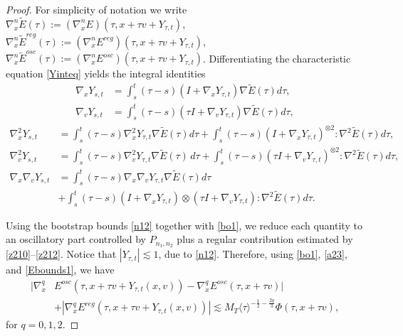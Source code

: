 \documentclass[reqno,11pt]{amsart}
\numberwithin{equation}{section}
\begin{document}
\begin{proof}
	For simplicity of notation we write $\nabla_x^n\widetilde{E}(\tau):=(\nabla_x^nE)(\tau,x+\tau v+Y_{\tau,t})$, $\nabla_x^n\widetilde{E}^{reg}(\tau):=(\nabla_x^nE^{reg})(\tau,x+\tau v+Y_{\tau,t})$, $\nabla_x^n\widetilde{E}^{osc}(\tau):=(\nabla_x^nE^{osc})(\tau,x+\tau v+Y_{\tau,t})$. Differentiating the characteristic equation \eqref{Yinteq} yields the integral identities
	\begin{equation}\label{nabla1Y}
		\begin{split}
			\nabla_xY_{s,t}&=\int_s^t(\tau-s)(I+\nabla_{x}Y_{\tau,t})\nabla \widetilde{E}(\tau)d\tau,\\
			\nabla_vY_{s,t}&=\int_s^t(\tau-s)(\tau I+\nabla_{v}Y_{\tau,t})\nabla \widetilde{E}(\tau)d\tau,
		\end{split}
	\end{equation}
	\begin{equation}\label{nabla2Y}
		\begin{split}
			\nabla_x^2Y_{s,t}&=\int_s^t(\tau-s)\nabla_{x}^2Y_{\tau,t}\nabla \widetilde{E}(\tau)d\tau+\int_s^t(\tau-s)(I+\nabla_{x}Y_{\tau,t})^{\otimes 2}:\nabla^2 \widetilde{E}(\tau)d\tau,\\
			\nabla_v^2Y_{s,t}&=\int_s^t(\tau-s)\nabla_{v}^2Y_{\tau,t}\nabla \widetilde{E}(\tau)\,d\tau+\int_s^t(\tau-s)(\tau I+\nabla_{v}Y_{\tau,t})^{\otimes 2}:\nabla^2 \widetilde{E}(\tau)d\tau,\\
			\nabla_x\nabla_{v}Y_{s,t}&=\int_s^t(\tau-s)\nabla_{x}\nabla_vY_{\tau,t}\nabla \widetilde{E}(\tau)d\tau\\
			&+\int_s^t(\tau-s)(I+\nabla_{x}Y_{\tau,t})\otimes (\tau I+\nabla_{v}Y_{\tau,t}):\nabla^2 \widetilde{E}(\tau)d\tau.
		\end{split}
	\end{equation}
	
	Using the bootstrap bounds \eqref{n12} together with \eqref{bo1}, we reduce each quantity to an oscillatory part controlled by $P_{n_1,n_2}$ plus a regular contribution estimated by \eqref{z210}--\eqref{z212}. Notice that $|Y_{\tau,t}|\lesssim1$, due to \eqref{n12}. Therefore, using \eqref{bo1}, \eqref{a23}, and \eqref{Ebounds1}, we have
	\begin{equation}\label{Ecomp}
		\begin{split}
			|\nabla_x^q&E^{osc}(\tau,x+\tau v+Y_{\tau,t}(x,v))
			-\nabla_x^qE^{osc}(\tau,x+\tau v)|\\
			&+|\nabla_x^qE^{reg}(\tau,x+\tau v+Y_{\tau,t}(x,v))|\lesssim M_T\langle\tau\rangle^{-\frac12-\frac{2q}{3}}\Phi(\tau,x+\tau v),
		\end{split}
	\end{equation}
	for $q=0,1,2$. 
	

\end{proof}
\end{document}
